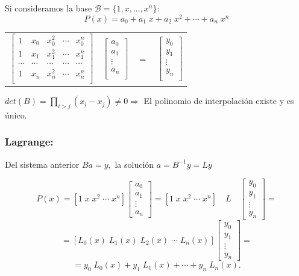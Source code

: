 \documentclass[ebook,oneside]{memoir}
\begin{document}
Si consideramos la base ${\mathcal  B}=\{1,x,\ldots,x^n\}$:
$$P(x)=a_0+a_1 \;x+a_2\; x^2+\cdots+a_n \;x^n$$

\begin{center}
\begin{tabular}{cccc} $\left[ \begin{array}{ccccc}
1&x_0&x_0^2&\cdots&x_0^n\\
1&x_1&x_1^2&\cdots&x_1^n\\
\cdots&\cdots&\cdots&\cdots&\cdots\\
1&x_n&x_n^2&\cdots&x_n^n\\
\end{array} \right]$ & $\left[ \begin{array}{c} a_0\\a_1\\ \vdots \\ a_n \\ \end{array} \right] $& $=$ &
$\left[ \begin{array}{c} y_0\\y_1\\ \vdots \\ y_n \\
\end{array}\right]$
\end{tabular}
\end{center}

\vspace{0.3cm}

$det(B)=\prod_ {i>j}(x_i-x_j)\neq 0 \Rightarrow$ El polinomio de interpolaci\'{o}n existe y es \'{u}nico.

\subsubsection{Lagrange:}

Del sistema anterior $Ba=y,$ la soluci\'{o}n $a=B^{-1}y=Ly$

$$P(x)=[1\;x\;x^2\; \cdots\; x^n]\left[\begin{array}{c} a_0\\a_1\\
\vdots \\a_n \end{array}\right]=[1\;x\;x^2\; \cdots\; x^n]\quad L\quad \left[\begin{array}{c} y_0\\y_1\\
\vdots \\y_n \end{array}\right]=$$
$$=[L_0(x)\;L_1(x)\;L_2(x)\; \cdots\; L_n(x)]\left[\begin{array}{c} y_0\\y_1\\
\vdots \\y_n
\end{array}\right]=$$
$$=y_0\;L_0(x)+y_1\;L_1(x)+\cdots+y_n\;L_n(x).$$
\end{document}
